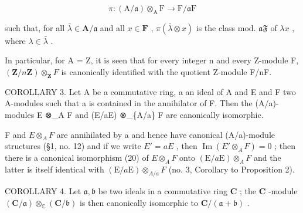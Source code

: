 \[
\pi : (\mathrm{A} / \mathfrak {a}) \otimes_ {\mathrm{A}} \mathrm{F} \rightarrow \mathrm{F} / \mathfrak {a} \mathrm{F}\tag{21}
\]

such that, for all \(\bar{\lambda} \in \mathbf{A} / \mathfrak{a}\) and all \(x \in \mathbf{F}\) , \(\pi(\bar{\lambda} \otimes x)\) is the class mod. \(\mathfrak{aF}\) of \(\lambda x\) , where \(\lambda \in \bar{\lambda}\) .

In particular, for A = Z, it is seen that for every integer n and every Z-module F, \((\mathbf{Z}/n\mathbf{Z}) \otimes_{\mathbf{Z}} F\) is canonically identified with the quotient Z-module F/nF.

COROLLARY 3. Let A be a commutative ring, a an ideal of A and E and F two A-modules such that a is contained in the annihilator of F. Then the (A/a)-modules E ⊗\_A F and (E/aE) ⊗\_\{A/a\} F are canonically isomorphic.

F and \(E \otimes_{A} F\) are annihilated by a and hence have canonical (A/a)-module structures (§1, no. 12) and if we write \(E' = aE\) , then \(\operatorname{Im}(E' \otimes_{A} F) = 0\) ; then there is a canonical isomorphism (20) of \(E \otimes_{A} F\) onto \((\mathrm{E}/a\mathrm{E}) \otimes_{A} F\) and the latter is itself identical with \((\mathrm{E}/a\mathrm{E}) \otimes_{A/a} F\) (no. 3, Corollary to Proposition 2).

COROLLARY 4. Let \(\mathfrak{a}, \mathfrak{b}\) be two ideals in a commutative ring \(\mathbf{C}\) ; the \(\mathbf{C}\) -module \((\mathbf{C} / \mathfrak{a}) \otimes_{\mathbb{C}} (\mathbf{C} / \mathfrak{b})\) is then canonically isomorphic to \(\mathbf{C}/(\mathfrak{a} + \mathfrak{b})\) .

